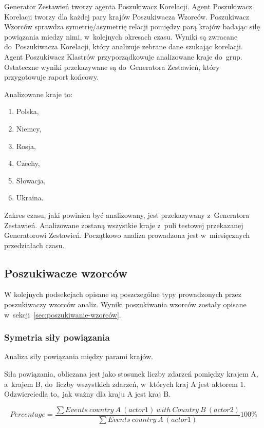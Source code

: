 \documentclass[11pt]{report}
\begin{document}
    Generator Zestawień tworzy agenta Poszukiwacz Korelacji.
    Agent Poszukiwacz Korelacji tworzy dla każdej pary krajów Poszukiwacza Wzorców.
    Poszukiwacz Wzorców sprawdza symetrię/asymetrię relacji pomiędzy parą krajów badając siłę powiązania miedzy nimi, w~kolejnych okresach czasu.
    Wyniki są zwracane do~Poszukiwacza Korelacji, który analizuje zebrane dane szukając korelacji.
    Agent Poszukiwacz Klastrów przyporządkowuje analizowane kraje do~grup.
    Ostateczne wyniki przekazywane są do~Generatora Zestawień, który przygotowuje raport końcowy.

    Analizowane kraje to:
    \begin{enumerate}
        \item Polska,
        \item Niemcy,
        \item Rosja,
        \item Czechy,
        \item Słowacja,
        \item Ukraina.
    \end{enumerate}

    Zakres czasu, jaki powinien być analizowany, jest przekazywany z~Generatora Zestawień.
    Analizowane zostaną wszystkie kraje z~puli testowej przekazanej Generatorowi Zestawień.
    Początkowo analiza prowadzona jest w~miesięcznych przedziałach czasu.

    \subsection{Poszukiwacze wzorców}
    W kolejnych podsekcjach opisane są poszczególne typy prowadzonych przez poszukiwaczy wzorców analiz.
    Wyniki poszukiwania wzorców zostały opisane w~sekcji~\ref{sec:poszukiwanie-wzorców}.

    \subsubsection{Symetria siły powiązania}
    Analiza siły powiązania między parami krajów.

    Siła powiązania, obliczana jest jako stosunek liczby zdarzeń pomiędzy krajem A, a~krajem B, do~liczby wszystkich zdarzeń, w~których kraj A jest aktorem 1.
    Odzwierciedla to,~jak ważny dla kraju A jest kraj B\@.


    \[ Percentage = \frac
    {\sum{Events\ country\ A\ (actor 1)\ with\ Country\ B\ (actor 2)}}
    {\sum{Events\ country\ A\ (actor 1)}}
    100 \%
    \]
\end{document}
